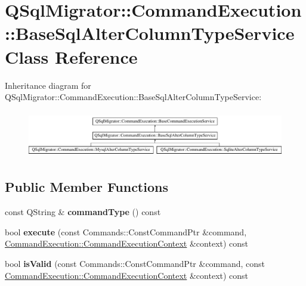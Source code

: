 \hypertarget{class_q_sql_migrator_1_1_command_execution_1_1_base_sql_alter_column_type_service}{}\section{Q\+Sql\+Migrator\+:\+:Command\+Execution\+:\+:Base\+Sql\+Alter\+Column\+Type\+Service Class Reference}
\label{class_q_sql_migrator_1_1_command_execution_1_1_base_sql_alter_column_type_service}
Inheritance diagram for Q\+Sql\+Migrator\+:\+:Command\+Execution\+:\+:Base\+Sql\+Alter\+Column\+Type\+Service\+:\begin{figure}[H]
\begin{center}
\leavevmode
\includegraphics[height=2.084367cm]{class_q_sql_migrator_1_1_command_execution_1_1_base_sql_alter_column_type_service}
\end{center}
\end{figure}
\subsection*{Public Member Functions}
\begin{DoxyCompactItemize}
\item 
\mbox{\label{class_q_sql_migrator_1_1_command_execution_1_1_base_sql_alter_column_type_service_a4ae10db4b241f5b65ecfffb01bcb5da7}} 
const Q\+String \& {\bfseries command\+Type} () const
\item 
\mbox{\label{class_q_sql_migrator_1_1_command_execution_1_1_base_sql_alter_column_type_service_a8e56cdd17ad78d954ce178d498771a26}} 
bool {\bfseries execute} (const Commands\+::\+Const\+Command\+Ptr \&command, \hyperlink{class_q_sql_migrator_1_1_command_execution_1_1_command_execution_context}{Command\+Execution\+::\+Command\+Execution\+Context} \&context) const
\item 
\mbox{\label{class_q_sql_migrator_1_1_command_execution_1_1_base_sql_alter_column_type_service_a4806fc79495db984bfb3e5719e5fe005}} 
bool {\bfseries is\+Valid} (const Commands\+::\+Const\+Command\+Ptr \&command, const \hyperlink{class_q_sql_migrator_1_1_command_execution_1_1_command_execution_context}{Command\+Execution\+::\+Command\+Execution\+Context} \&context) const
\end{DoxyCompactItemize}
